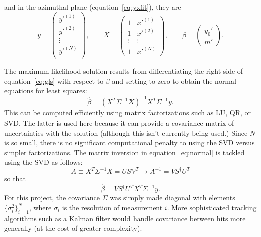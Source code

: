 \documentclass[12pt]{article}
\begin{document}
and in the azimuthal plane (equation~\ref{eq:yxfit}), they are
\begin{equation} \label{eq:xymat}
y = 
 \begin{pmatrix}
 y'^{(1)}\\
 y'^{(2)}\\
 \vdots \\
 y'^{(N)}\\
 \end{pmatrix},
 \qquad
X =
 \begin{pmatrix}
  1 & x'^{(1)} \\
  1 & x'^{(2)} \\
  \vdots  & \vdots \\
  1 & x'^{(N)} 
 \end{pmatrix},
 \qquad
\beta = 
 \begin{pmatrix}
 y_0'\\
 m'
 \end{pmatrix}.
\end{equation}



The maximum likelihood solution results from differentiating the right side of equation~\ref{eq:gls} with respect to $\beta$ and setting to zero to obtain the normal equations for least squares:
 \begin{equation}\label{eq:normal}
 \hat\beta = (X^T \Sigma^{-1} X)^{-1} X^T \Sigma^{-1} y.
 \end{equation}
This can be computed efficiently using matrix factorizations such as LU, QR, or SVD. The latter is used here because it can provide a covariance matrix of uncertainties with the solution (although this isn't currently being used.) Since $N$ is so small, there is no significant computational penalty to using the SVD versus simpler factorizations. The matrix inversion in equation~\ref{eq:normal} is tackled using the SVD as follows:
\begin{equation}\label{eq:svd}
A \equiv X^T \Sigma^{-1} X = U S V^T \to A^{-1} = V S^{\dagger} U^{T}
\end{equation}
so that 
\begin{equation}\label{eq:betahat}
\hat\beta = V S^{\dagger} U^{T} X^T \Sigma^{-1} y.
\end{equation}
For this project, the covariance $\Sigma$ was simply made diagonal with elements $\{\sigma_i^2 \}_{i=1}^N$, where $\sigma_i$ is the resolution of measurement $i$. More sophisticated tracking algorithms such as a Kalman filter would handle covariance between hits more generally (at the cost of greater complexity).
\end{document}
